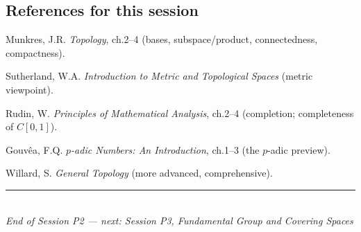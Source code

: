 \documentclass[11pt,a4paper]{article}
\theoremstyle{definition}
\begin{document}
	\subsection*{References for this session}
	\begin{enumerate}[label={[\arabic*]}]
		\item Munkres, J.R. \emph{Topology}, ch.2--4 (bases, subspace/product, connectedness, compactness).
		\item Sutherland, W.A. \emph{Introduction to Metric and Topological Spaces} (metric viewpoint).
		\item Rudin, W. \emph{Principles of Mathematical Analysis}, ch.2--4 (completion; completeness of $C[0,1]$).
		\item Gouv\^ea, F.Q. \emph{$p$-adic Numbers: An Introduction}, ch.1--3 (the $p$-adic preview).
		\item Willard, S. \emph{General Topology} (more advanced, comprehensive).
	\end{enumerate}
	
	\vspace{1.5em}
	\begin{center}
		\rule{0.6\textwidth}{0.4pt}\\[0.5em]
		\textit{End of Session P2 --- next: Session P3, Fundamental Group and Covering Spaces}
	\end{center}
	
\end{document}
